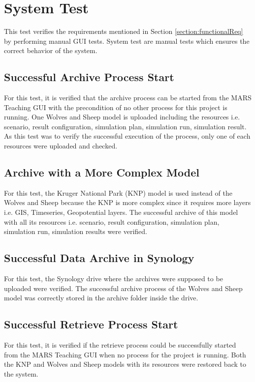 \section{System Test}
This test verifies the requirements mentioned in Section \ref{section:functionalReq} by performing manual GUI tests. System test are manual tests
which ensures the correct behavior of the system.

\subsection{Successful Archive Process Start}
For this test, it is verified that the archive process can be started from the MARS Teaching GUI with the precondition of no other process
for this project is running. One Wolves and Sheep model is uploaded including the resources i.e. scenario, result configuration,
simulation plan, simulation run, simulation result. As this test was to verify the successful execution of the process, only one of each resources
were uploaded and checked.

\subsection{Archive with a More Complex Model}
For this test, the Kruger National Park (KNP) model is used instead of the Wolves and Sheep because the KNP is more complex since it requires more layers
i.e. GIS, Timeseries, Geopotential layers. The successful archive of this model with all its resources i.e. scenario, result configuration, simulation plan, simulation run,
simulation results were verified. 

\subsection{Successful Data Archive in Synology}
For this test, the Synology drive where the archives were supposed to be uploaded were verified. The successful archive process of the Wolves and Sheep model
was correctly stored in the archive folder inside the drive.

\subsection{Successful Retrieve Process Start}
For this test, it is verified if the retrieve process could be successfully started from the MARS Teaching GUI when no process for the project is running.
Both the KNP and Wolves and Sheep models with its resources were restored back to the system. 

